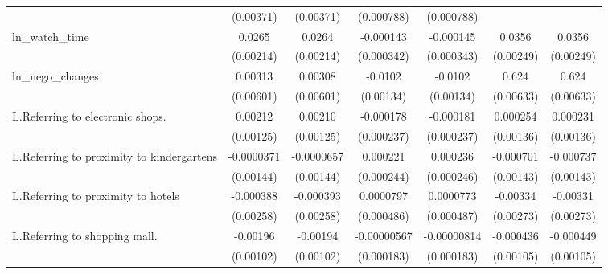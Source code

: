 {\begin{tabular}{l*{6}{c}}
                    &   (0.00371)         &   (0.00371)         &  (0.000788)         &  (0.000788)         &                     &                     \\
\addlinespace
ln\_watch\_time       &      0.0265\sym{***}&      0.0264\sym{***}&   -0.000143         &   -0.000145         &      0.0356\sym{***}&      0.0356\sym{***}\\
                    &   (0.00214)         &   (0.00214)         &  (0.000342)         &  (0.000343)         &   (0.00249)         &   (0.00249)         \\
\addlinespace
ln\_nego\_changes     &     0.00313         &     0.00308         &     -0.0102\sym{***}&     -0.0102\sym{***}&       0.624\sym{***}&       0.624\sym{***}\\
                    &   (0.00601)         &   (0.00601)         &   (0.00134)         &   (0.00134)         &   (0.00633)         &   (0.00633)         \\
\addlinespace
L.Referring to electronic shops.&     0.00212\sym{*}  &     0.00210\sym{*}  &   -0.000178         &   -0.000181         &    0.000254         &    0.000231         \\
                    &   (0.00125)         &   (0.00125)         &  (0.000237)         &  (0.000237)         &   (0.00136)         &   (0.00136)         \\
\addlinespace
L.Referring to proximity to kindergartens&  -0.0000371         &  -0.0000657         &    0.000221         &    0.000236         &   -0.000701         &   -0.000737         \\
                    &   (0.00144)         &   (0.00144)         &  (0.000244)         &  (0.000246)         &   (0.00143)         &   (0.00143)         \\
\addlinespace
L.Referring to proximity to hotels&   -0.000388         &   -0.000393         &   0.0000797         &   0.0000773         &    -0.00334         &    -0.00331         \\
                    &   (0.00258)         &   (0.00258)         &  (0.000486)         &  (0.000487)         &   (0.00273)         &   (0.00273)         \\
\addlinespace
L.Referring to shopping mall.&    -0.00196\sym{*}  &    -0.00194\sym{*}  & -0.00000567         & -0.00000814         &   -0.000436         &   -0.000449         \\
                    &   (0.00102)         &   (0.00102)         &  (0.000183)         &  (0.000183)         &   (0.00105)         &   (0.00105)         \\

\end{tabular}}
